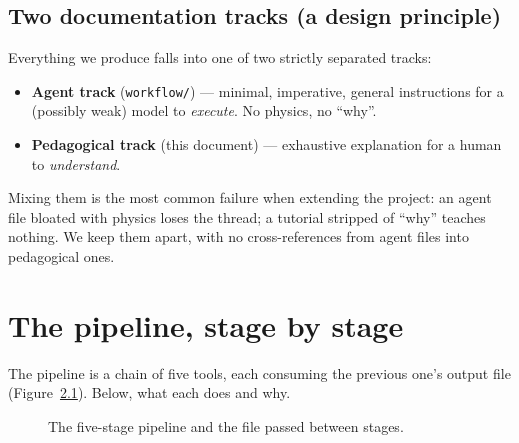 \documentclass[11pt,oneside]{report}
\newcommand{\code}[1]{\texttt{#1}}
\begin{document}
\section{Two documentation tracks (a design principle)}
Everything we produce falls into one of two strictly separated tracks:
\begin{itemize}[nosep]
  \item \textbf{Agent track} (\code{workflow/}) --- minimal, imperative, general instructions for a
        (possibly weak) model to \emph{execute}. No physics, no ``why''.
  \item \textbf{Pedagogical track} (this document) --- exhaustive explanation for a human to
        \emph{understand}.
\end{itemize}
Mixing them is the most common failure when extending the project: an agent file bloated with
physics loses the thread; a tutorial stripped of ``why'' teaches nothing. We keep them apart, with
no cross-references from agent files into pedagogical ones.

\chapter{The pipeline, stage by stage}
\label{ch:pipeline}
The pipeline is a chain of five tools, each consuming the previous one's output file
(Figure~\ref{fig:flow}). Below, what each does and why.

\begin{figure}[h]\centering
{}
\caption{The five-stage pipeline and the file passed between stages.}\label{fig:flow}
\end{figure}
\end{document}
